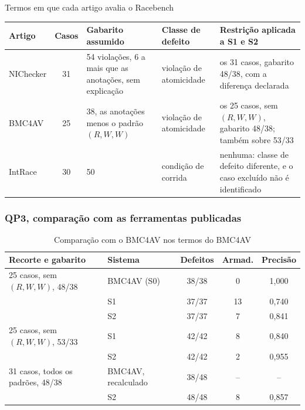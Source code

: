 \begin{quadro}[htb]
  \caption{\label{quadro:termos}Termos em que cada artigo avalia o Racebench}
  \small
  \begin{tabular}{|L{2.0cm}|c|L{3.4cm}|L{2.3cm}|L{3.4cm}|}
    \hline
    Artigo & Casos & Gabarito assumido & Classe de defeito & Restrição aplicada a S1 e S2 \\
    \hline
    NIChecker & 31 & 54 violações, 6 a mais que as anotações, sem explicação &
    violação de atomicidade & os 31 casos, gabarito 48/38, com a diferença
    declarada \\
    \hline
    BMC4AV & 25 & 38, as anotações menos o padrão $(R,W,W)$ & violação de
    atomicidade & os 25 casos, sem $(R,W,W)$, gabarito 48/38; também sobre
    53/33 \\
    \hline
    IntRace & 30 & 50 & condição de corrida & nenhuma: classe de defeito
    diferente, e o caso excluído não é identificado \\
    \hline
  \end{tabular}
\end{quadro}


\subsubsection{QP3, comparação com as ferramentas publicadas}

\begin{table}[htb]
  \centering
  \caption{Comparação com o BMC4AV nos termos do BMC4AV}
  \label{tab:qp3-bmc4av}
  \small
  \begin{tabular}{|l|l|c|c|c|}
    \hline
    Recorte e gabarito & Sistema & Defeitos & Armad. & Precisão \\
    \hline
    25 casos, sem $(R,W,W)$, 48/38 & BMC4AV (S0) & 38/38 & 0 & 1,000 \\
    & S1 & 37/37 & 13 & 0,740 \\
    & S2 & 37/37 & 7 & 0,841 \\
    \hline
    25 casos, sem $(R,W,W)$, 53/33 & S1 & 42/42 & 8 & 0,840 \\
    & S2 & 42/42 & 2 & 0,955 \\
    \hline
    31 casos, todos os padrões, 48/38 & BMC4AV, recalculado & 38/48 & -- & -- \\
    & S2 & 48/48 & 8 & 0,857 \\
    \hline
  \end{tabular}
\end{table}

